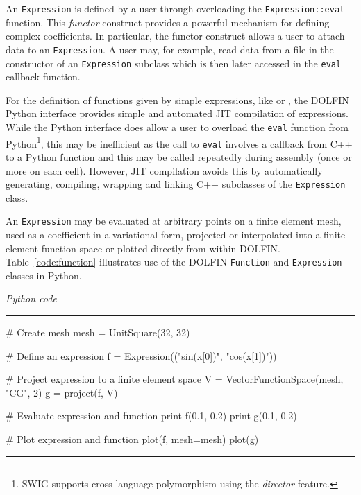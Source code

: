 \documentclass[acmtoms]{acmtrans2m}
\newenvironment{pythoncode}[1]{\center\minipage{#1\textwidth}\footnotesize\hfill\it Python code \rm\vspace{0.1cm}\hrule\renewcommand{\baselinestretch}{0.9}\footnotesize\verbatim}{\endverbatim\hrule\normalsize\endminipage\newline\endcenter}
\newcommand{\emp}[1]{\texttt{#1}}
\newcommand{\dolfin}{DOLFIN}
\begin{document}
An \emp{Expression} is defined by a user through overloading the
\emp{Expression::eval} function. This \emph{functor} construct
provides a powerful mechanism for defining complex coefficients. In
particular, the functor construct allows a user to attach data to an
\emp{Expression}. A user may, for example, read data from a file
in the constructor of an \emp{Expression} subclass which is then later
accessed in the \emp{eval} callback function.

For the definition of functions given by simple expressions, like
 or , the \dolfin{} Python
interface provides simple and automated JIT compilation of
expressions. While the Python interface does allow a user to overload
the \emp{eval} function from Python\footnote{SWIG supports
  cross-language polymorphism using the \emph{director} feature.},
this may be inefficient as the call to \emp{eval} involves a callback
from C++ to a Python function and this may be called repeatedly during
assembly (once or more on each cell). However, JIT compilation avoids
this by automatically generating, compiling, wrapping and linking C++
subclasses of the \emp{Expression} class.

An \emp{Expression} may be evaluated at arbitrary points on a finite
element mesh, used as a coefficient in a variational form, projected
or interpolated into a finite element function space or plotted
directly from within \dolfin{}. Table~\ref{code:function} illustrates
use of the \dolfin{} \emp{Function} and \emp{Expression} classes in
Python.

\begin{table}
  \begin{center}
    \begin{pythoncode}{0.9}
# Create mesh
mesh = UnitSquare(32, 32)

# Define an expression
f = Expression(("sin(x[0])", "cos(x[1])"))

# Project expression to a finite element space
V = VectorFunctionSpace(mesh, "CG", 2)
g = project(f, V)

# Evaluate expression and function
print f(0.1, 0.2)
print g(0.1, 0.2)

# Plot expression and function
plot(f, mesh=mesh)
plot(g)
    \end{pythoncode}
    \caption{Defining, projecting, evaluating and plotting expressions
      and functions using the \dolfin{} Python interface.}
    \label{code:function}
  \end{center}
\end{table}
\end{document}
